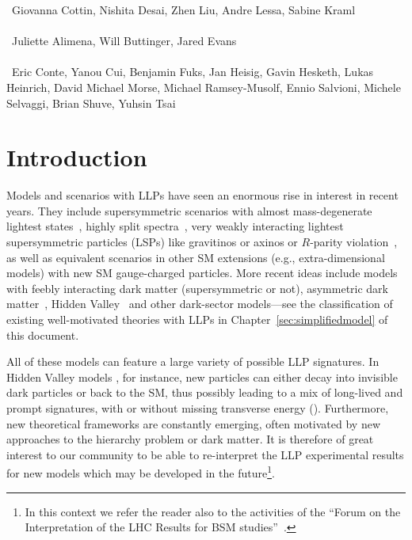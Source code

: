 ~Giovanna Cottin, Nishita Desai, Zhen Liu, Andre Lessa, Sabine Kraml\\
\text{ \; }\\
~Juliette Alimena, Will Buttinger, Jared Evans\\
\text{ \; }\\
~Eric Conte, Yanou Cui, Benjamin Fuks, Jan Heisig, Gavin Hesketh, Lukas Heinrich,  David Michael Morse, Michael Ramsey-Musolf, Ennio Salvioni, Michele Selvaggi, Brian Shuve, Yuhsin Tsai
\text{ \; }\\

\section{Introduction}
\label{sec:ch5-introduction}

Models and scenarios with LLPs have seen an enormous rise in interest in recent years.
They include supersymmetric scenarios with almost mass-degenerate lightest states~\cite{Chen:1995yu,Feng:1999fu},
highly split spectra~\cite{ArkaniHamed:2004fb,Giudice:2004tc}, very weakly interacting
lightest supersymmetric particles (LSPs) like gravitinos or
axinos \cite{Pagels:1981ke,Covi:1999ty} or $R$-parity violation~\cite{Barbier:2004ez},
as well as equivalent scenarios in other SM extensions (e.g., extra-dimensional models) with new SM gauge-charged particles.
More recent ideas include models with feebly interacting dark matter \cite{Hall:2009bx} (supersymmetric or not), asymmetric dark matter~\cite{Zurek:2013wia}, Hidden Valley~\cite{Strassler:2006im} and other dark-sector models---see the classification of existing well-motivated theories with LLPs in Chapter~\ref{sec:simplifiedmodel} of this document.

All of these models can feature a large variety of possible LLP signatures. In Hidden Valley models \cite{Strassler:2006im}, for instance,
new particles can either decay into invisible dark particles or back to the SM, thus possibly leading to a
mix of long-lived and prompt signatures, with or without missing transverse energy (\MET).
Furthermore, new theoretical frameworks are constantly emerging, often motivated by
new approaches to the hierarchy problem or dark matter.
It is therefore of great interest to our community to be able to
re-interpret the LLP experimental results
for new models which may be developed in the future\footnote{In this context we refer the reader also to
the activities of the ``Forum on the Interpretation of the LHC Results for BSM studies''~\cite{reinterpretationForum}.}.

